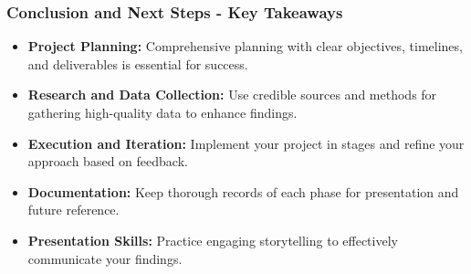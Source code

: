 \documentclass{beamer}
\begin{document}
\begin{frame}[fragile]
    \frametitle{Conclusion and Next Steps - Key Takeaways}
    \begin{itemize}
        \item \textbf{Project Planning:} Comprehensive planning with clear objectives, timelines, and deliverables is essential for success.
        
        \item \textbf{Research and Data Collection:} Use credible sources and methods for gathering high-quality data to enhance findings.
        
        \item \textbf{Execution and Iteration:} Implement your project in stages and refine your approach based on feedback.
        
        \item \textbf{Documentation:} Keep thorough records of each phase for presentation and future reference.
        
        \item \textbf{Presentation Skills:} Practice engaging storytelling to effectively communicate your findings.
    \end{itemize}
\end{frame}
\end{document}
